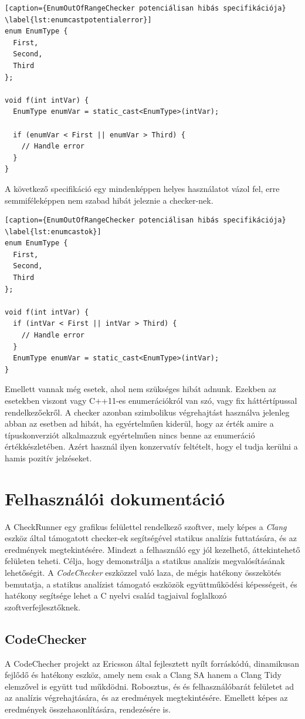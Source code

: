 \documentclass[a4paper,12pt]{report}
\begin{document}
\begin{lstlisting}[caption={EnumOutOfRangeChecker potenciálisan hibás specifikációja}
\label{lst:enumcastpotentialerror}]
enum EnumType {
  First,
  Second,
  Third
};
 
void f(int intVar) {
  EnumType enumVar = static_cast<EnumType>(intVar);
 
  if (enumVar < First || enumVar > Third) {
    // Handle error
  }
}
\end{lstlisting}

A következő specifikáció egy mindenképpen helyes használatot vázol fel, erre semmiféleképpen nem szabad hibát jeleznie a checker-nek.

\begin{lstlisting}[caption={EnumOutOfRangeChecker potenciálisan hibás specifikációja}
\label{lst:enumcastok}]
enum EnumType {
  First,
  Second,
  Third
};
 
void f(int intVar) {
  if (intVar < First || intVar > Third) {
    // Handle error
  }
  EnumType enumVar = static_cast<EnumType>(intVar);
}
\end{lstlisting}

Emellett vannak még esetek, ahol nem szükséges hibát adnunk. Ezekben az esetekben viszont vagy C++11-es enumerációkról van szó, vagy fix háttértípussal rendelkezőekről. A checker azonban szimbolikus végrehajtást használva jelenleg abban az esetben ad hibát, ha egyértelműen kiderül, hogy az érték amire a típuskonverziót alkalmazzuk egyértelműen nincs benne az enumeráció értékkészletében. Azért használ ilyen konzervatív feltételt, hogy el tudja kerülni a hamis pozitív jelzéseket.

\chapter{Felhasználói dokumentáció}
A CheckRunner egy grafikus felülettel rendelkező szoftver, mely képes a \emph{Clang} eszköz által támogatott checker-ek segítségével statikus analízis futtatására, és az eredmények megtekintésére. Mindezt a felhasználó egy jól kezelhető, áttekintehető felületen teheti. Célja, hogy demonstrálja a statikus analízis megvalósításának lehetőségit. A \emph{CodeChecker} eszközzel való laza, de mégis hatékony összekötés bemutatja, a statikus analízist támogató eszközök együttműködési képességeit, és hatékony segítsége lehet a C nyelvi család tagjaival foglalkozó szoftverfejlesztőknek.

\section{CodeChecker}
A CodeChecher projekt az Ericsson által fejlesztett nyílt forráskódú, dinamikusan fejlődő és hatékony eszköz, amely nem csak a Clang SA hanem a Clang Tidy elemzővel is együtt tud műkdödni. Robosztus, és és felhasználóbarát felületet ad az analízis végrehajtására, és az eredmények megtekintésére. Emellett képes az eredmények összehasonlítására, rendezésére is.
\end{document}
